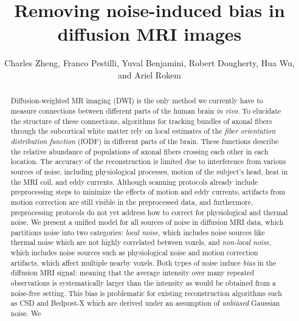 \documentclass[11pt]{article}
\begin{document}
\newcommand{\tr}{\text{tr}}
\newcommand{\E}{\textbf{E}}
\newcommand{\diag}{\text{diag}}
\newcommand{\argmax}{\text{argmax}}
\newcommand{\argmin}{\text{argmin}}
\newcommand{\Cov}{\text{Cov}}
\newcommand{\Vol}{\text{Vol}}
\pagestyle{fancy}

\title{Removing noise-induced bias in diffusion MRI images}

\author{Charles Zheng, Franco Pestilli, Yuval Benjamini, Robert Dougherty, Hua Wu, and Ariel Rokem}

\maketitle

\begin{abstract}
Diffusion-weighted MR imaging (DWI) is the only method we currently
have to measure connections between different parts of the human brain
\emph{in vivo}.  To elucidate the structure of these connections,
algorithms for tracking bundles of axonal fibers through the
subcortical white matter rely on local estimates of the \emph{fiber
  orientation distribution function} (fODF) in different parts of the
brain. These functions describe the relative abundance of populations
of axonal fibers crossing each other in each location.  The accuracy
of the reconstruction is limited due to interference from various
sources of noise, including physiological processes, motion of the
subject's head, heat in the MRI coil, and eddy currents.  Although
scanning protocols already include preprocessing steps to minimize the
effects of motion and eddy currents, artifacts from motion correction
are still visible in the preprocessed data, and furthermore,
preprocessing protocols do not yet address how to correct for
physiological and thermal noise.  We present a unified model for all
sources of noise in diffusion MRI data, which partitions noise into
two categories: \emph{local noise}, which includes noise sources like
thermal noise which are not highly correlated between voxels, and
\emph{non-local noise}, which includes noise sources such as
physiological noise and motion correction artifacts, which affect
multiple nearby voxels.  Both types of noise induce \emph{bias} in the
diffusion MRI signal: meaning that the average intensity over many
repeated observations is systematically larger than the intensity as
would be obtained from a noise-free setting.  This bias is problematic
for existing reconstruction algorithms such as CSD and Bedpost-X which
are derived under an assumption of \emph{unbiased} Gaussian noise.  We

\end{abstract}
\end{document}
